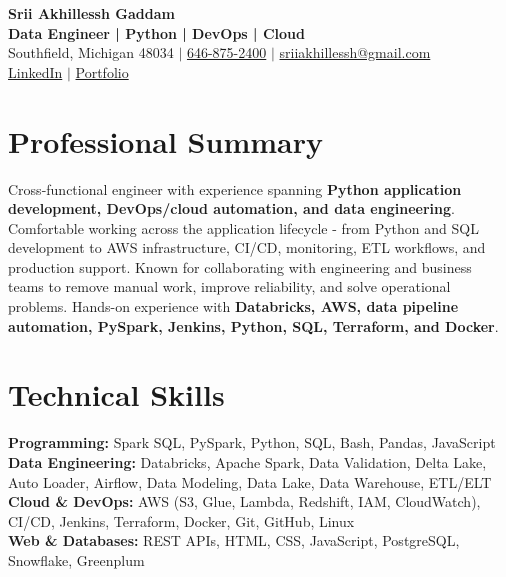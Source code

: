 \documentclass[letterpaper,10pt]{article}
\begin{document}
\fontsize{9.35pt}{10.45pt}\selectfont

\begin{center}
    {\LARGE \textbf{Srii Akhillessh Gaddam}} \\[-1pt]
    \textbf{Data Engineer | Python | DevOps | Cloud} \\[2pt]
    Southfield, Michigan 48034 $|$
    \href{tel:6468752400}{646-875-2400} $|$
    \href{mailto:sriiakhillessh@gmail.com}{sriiakhillessh@gmail.com} \\[1pt]
    \href{https://www.linkedin.com/in/srii-akhiilessh-gaddam-b48668191/}{LinkedIn} $|$
    \href{https://sriiakhillesshg.github.io/portfolio/}{Portfolio}
\end{center}
\vspace{-8pt}

\section{Professional Summary}
\small{Cross-functional engineer with experience spanning \textbf{Python application development, DevOps/cloud automation, and data engineering}. Comfortable working across the application lifecycle - from Python and SQL development to AWS infrastructure, CI/CD, monitoring, ETL workflows, and production support. Known for collaborating with engineering and business teams to remove manual work, improve reliability, and solve operational problems. Hands-on experience with \textbf{Databricks, AWS, data pipeline automation, PySpark, Jenkins, Python, SQL, Terraform, and Docker}.}

\section{Technical Skills}
\small{
\textbf{Programming:} Spark SQL, PySpark, Python, SQL, Bash, Pandas, JavaScript \\
\textbf{Data Engineering:} Databricks, Apache Spark, Data Validation, Delta Lake, Auto Loader, Airflow, Data Modeling, Data Lake, Data Warehouse, ETL/ELT \\
\textbf{Cloud \& DevOps:} AWS (S3, Glue, Lambda, Redshift, IAM, CloudWatch), CI/CD, Jenkins, Terraform, Docker, Git, GitHub, Linux \\
\textbf{Web \& Databases:} REST APIs, HTML, CSS, JavaScript, PostgreSQL, Snowflake, Greenplum
}
\end{document}
